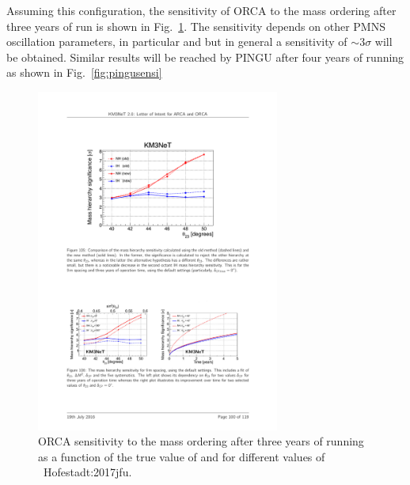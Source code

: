 Assuming this configuration, the sensitivity of ORCA to the mass ordering after three years of run is shown in Fig.~\ref{fig:orcasensi}. The sensitivity depends on other PMNS oscillation parameters, in particular \thatm and \dcp but in general a sensitivity of $\sim3\sigma$ will be obtained. Similar results will be reached by PINGU after four years of running as shown in Fig.~\ref{fig:pingusensi}

\begin{figure} [htbp!]
\begin{center}
\includegraphics[width=8cm]{figures/orca_sensi.pdf}
\caption{\label{fig:orcasensi} ORCA sensitivity to the mass ordering after three years of running as a function of the true value of \thatm and for different values of \dcp~{Hofestadt:2017jfu}.}
\end{center}
\end{figure}

